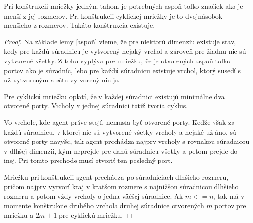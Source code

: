 \begin{veta}
Pri konštrukcii mriežky jedným ťahom je potrebných aspoň toľko značiek ako
je menší z jej rozmerov. Pri konštrukcii cyklickej mriežky je to dvojnásobok
menšieho z rozmerov. Takáto konštrukcia existuje.
\end{veta}
\begin{proof}
Na základe lemy \ref{aspoň} vieme, že pre niektorú dimenziu existuje stav,
kedy pre každú súradnicu je vytvorený nejaký vrchol a zároveň pre žiadnu nie
sú vytvorené všetky. Z toho vyplýva pre mriežku, že je otvorených aspoň
toľko portov ako je súradníc, lebo pre každú súradnicu existuje vrchol,
ktorý susedí s už vytvoreným a ešte vytvorený nie je.

Pre cyklickú mriežku oplatí, že v každej súradnici existujú minimálne dva
otvorené porty. Vrcholy v jednej súradnici totiž tvoria cyklus.

Vo vrchole, kde agent práve stojí, nemusia byť otvorené porty. Keďže však za
každú súradnicu, v ktorej nie sú vytvorené všetky vrcholy a nejaké už áno,
sú otvorené porty navyše, tak agent prechádza najprv vrcholy s rovnakou 
súradnicou v dlhšej dimenzii, kým neprejde pre danú súradnicu všetky a potom
prejde do inej. Pri tomto prechode musí otvoriť ten posledný port.

Mriežku pri konštrukcii agent prechádza po súradniciach dlhšieho rozmeru,
pričom najprv vytvorí kraj v kratšom rozmere s najnižšou súradnicou dlhšieho
rozmeru a potom vždy vrcholy o jedna väčšej súradnice. Ak $m <= n$, tak má v
momente konštrukcie druhého vrchola druhej súradnice otvorených $m$ portov
pre mriežku a $2m + 1$ pre cyklickú mriežku.
\end{proof}



